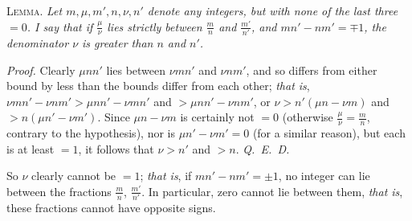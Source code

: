 
\textsc{Lemma.} \textit{Let $m,\mu,m',n,\nu,n'$ denote any integers, but with none of the last three $=0$. I say that if $\frac{\mu}{\nu}$ lies strictly between $\frac{m}{n}$ and $\frac{m'}{n'}$, and $mn'-nm'={\mp1}$, the denominator $\nu$ is greater than $n$ and $n'$.}

\textit{Proof.} Clearly $\mu nn'$ lies between $\nu mn'$ and $\nu nm'$, and so differs from either bound by less than the bounds differ from each other; \textit{that is}, $\nu mn'-\nu nm'>\mu nn'-\nu mn'$ and $>\mu nn'-\nu nm'$, or $\nu>n'(\mu n-\nu m)$ and $>n(\mu n'-\nu m')$. Since $\mu n-\nu m$ is certainly not $=0$ (otherwise $\frac{\mu}{\nu}=\frac{m}{n}$, contrary to the hypothesis), nor is $\mu n'-\nu m'=0$ (for a similar reason), but each is at least $=1$, it follows that $\nu>n'$ and $>n$. \mbox{\textit{Q. E. D.}}

So $\nu$ clearly cannot be $=1$; \textit{that is}, if $mn'-nm'=\pm1$, no integer can lie between the fractions $\frac{m}{n}$, $\frac{m'}{n'}$. In particular, zero cannot lie between them, \textit{that is}, these fractions cannot have opposite signs.
